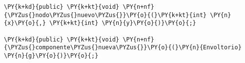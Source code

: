 \begin{Verbatim}[commandchars=\\\{\}]
\PY{k+kd}{public} \PY{k+kt}{void} \PY{n+nf}{\PYZus{}nodo\PYZus{}nuevo\PYZus{}}\PY{o}{(}\PY{k+kt}{int} \PY{n}{x}\PY{o}{,} \PY{k+kt}{int} \PY{n}{y}\PY{o}{)}\PY{o}{;}

\PY{k+kd}{public} \PY{k+kt}{void} \PY{n+nf}{\PYZus{}componente\PYZus{}nueva\PYZus{}}\PY{o}{(}\PY{n}{Envoltorio} \PY{n}{g}\PY{o}{)}\PY{o}{;}
\end{Verbatim}
